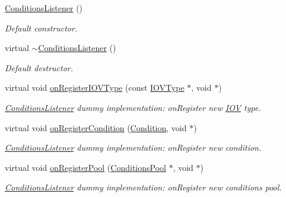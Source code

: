\begin{DoxyCompactItemize}
\item 
\hyperlink{class_d_d4hep_1_1_conditions_1_1_conditions_listener_a3045043973d530d2c01ccb26462a8795}{Conditions\+Listener} ()
\begin{DoxyCompactList}\small\item\em Default constructor. \end{DoxyCompactList}\item 
virtual \hyperlink{class_d_d4hep_1_1_conditions_1_1_conditions_listener_a75358af2c660cee415619ba50c2bea74}{$\sim$\+Conditions\+Listener} ()
\begin{DoxyCompactList}\small\item\em Default destructor. \end{DoxyCompactList}\item 
virtual void \hyperlink{class_d_d4hep_1_1_conditions_1_1_conditions_listener_a8757616579713cf0101d5c6b68460f9d}{on\+Register\+I\+O\+V\+Type} (const \hyperlink{class_d_d4hep_1_1_i_o_v_type}{I\+O\+V\+Type} $\ast$, void $\ast$)
\begin{DoxyCompactList}\small\item\em \hyperlink{class_d_d4hep_1_1_conditions_1_1_conditions_listener}{Conditions\+Listener} dummy implementation\+: on\+Register new \hyperlink{class_d_d4hep_1_1_i_o_v}{I\+OV} type. \end{DoxyCompactList}\item 
virtual void \hyperlink{class_d_d4hep_1_1_conditions_1_1_conditions_listener_a848d047b6a957987ea1a8256e6efd75a}{on\+Register\+Condition} (\hyperlink{class_d_d4hep_1_1_conditions_1_1_condition}{Condition}, void $\ast$)
\begin{DoxyCompactList}\small\item\em \hyperlink{class_d_d4hep_1_1_conditions_1_1_conditions_listener}{Conditions\+Listener} dummy implementation\+: on\+Register new condition. \end{DoxyCompactList}\item 
virtual void \hyperlink{class_d_d4hep_1_1_conditions_1_1_conditions_listener_a161a768eb8f00b3272d85f95ec14fa86}{on\+Register\+Pool} (\hyperlink{class_d_d4hep_1_1_conditions_1_1_conditions_pool}{Conditions\+Pool} $\ast$, void $\ast$)
\begin{DoxyCompactList}\small\item\em \hyperlink{class_d_d4hep_1_1_conditions_1_1_conditions_listener}{Conditions\+Listener} dummy implementation\+: on\+Register new conditions pool. \end{DoxyCompactList}\item 

\end{DoxyCompactItemize}
